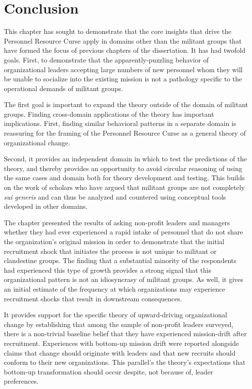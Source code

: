 

\section{Conclusion}

This chapter has sought to demonstrate that the core insights that drive the Personnel Resource Curse apply in domains other than the militant groups that have formed the focus of previous chapters of the dissertation. It has had twofold goals. First, to demonstrate that the apparently-puzzling behavior of organizational leaders accepting large numbers of new personnel whom they will be unable to socialize into the existing mission is not a pathology specific to the operational demands of militant groups. 

The first goal is important to expand the theory outside of the domain of militant groups. Finding cross-domain applications of the theory has important implications. First, finding similar behavioral patterns in a separate domain is reassuring for the framing of the Personnel Resource Curse as a general theory of organizational change. 

Second, it provides an independent domain in which to test the predictions of the theory, and thereby provides an opportunity to avoid circular reasoning of using the same cases and domain both for theory development and testing. This builds on the work of scholars who have argued that militant groups are not completely \textit{sui generis} and can thus be analyzed and countered using conceptual tools developed in other domains.

The chapter presented the results of asking non-profit leaders and managers whether they had ever experienced a rapid intake of personnel that do not share the organization's original mission in order to demonstrate that the initial recruitment shock that initiates the process is not unique to militant or clandestine groups. The finding that a substantial minority of the respondents had experienced this type of growth provides a strong signal that this organizational pattern is not an idiosyncrasy of militant groups. As well, it gives an initial estimate of the frequency at which organizations may experience recruitment shocks that result in downstream consequences. 

It provides support for the specific theory of upward-driving organizational change by establishing that among the sample of non-profit leaders surveyed, there is a non-trivial baseline belief that they have experienced mission-drift after recruitment. Experiences with bottom-up mission drift were reported alongside claims that change should originate with leaders and that new recruits should conform to their new organizations. This parallel's the theory's expectations that bottom-up transformation should occur despite, not because of, leader preferences.

